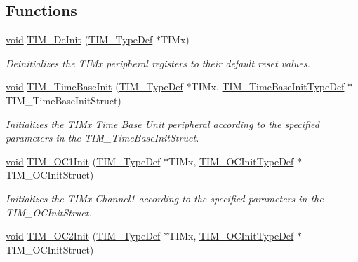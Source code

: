 \subsection*{Functions}
\begin{DoxyCompactItemize}
\item 
\hyperlink{usb__devapi_8h_afabf60e7f57651d6d595a02c75f07cd0}{void} \hyperlink{group___t_i_m___private___functions_ga1659cc0ce503ac151568e0c7c02b1ba5}{T\+I\+M\+\_\+\+De\+Init} (\hyperlink{struct_t_i_m___type_def}{T\+I\+M\+\_\+\+Type\+Def} $\ast$T\+I\+Mx)
\begin{DoxyCompactList}\small\item\em Deinitializes the T\+I\+Mx peripheral registers to their default reset values. \end{DoxyCompactList}\item 
\hyperlink{usb__devapi_8h_afabf60e7f57651d6d595a02c75f07cd0}{void} \hyperlink{group___t_i_m___private___functions_ga83fd58c9416802d9638bbe1715c98932}{T\+I\+M\+\_\+\+Time\+Base\+Init} (\hyperlink{struct_t_i_m___type_def}{T\+I\+M\+\_\+\+Type\+Def} $\ast$T\+I\+Mx, \hyperlink{struct_t_i_m___time_base_init_type_def}{T\+I\+M\+\_\+\+Time\+Base\+Init\+Type\+Def} $\ast$T\+I\+M\+\_\+\+Time\+Base\+Init\+Struct)
\begin{DoxyCompactList}\small\item\em Initializes the T\+I\+Mx Time Base Unit peripheral according to the specified parameters in the T\+I\+M\+\_\+\+Time\+Base\+Init\+Struct. \end{DoxyCompactList}\item 
\hyperlink{usb__devapi_8h_afabf60e7f57651d6d595a02c75f07cd0}{void} \hyperlink{group___t_i_m___private___functions_gafcdb6ff00158862aef7fed5e7a554a3e}{T\+I\+M\+\_\+\+O\+C1\+Init} (\hyperlink{struct_t_i_m___type_def}{T\+I\+M\+\_\+\+Type\+Def} $\ast$T\+I\+Mx, \hyperlink{struct_t_i_m___o_c_init_type_def}{T\+I\+M\+\_\+\+O\+C\+Init\+Type\+Def} $\ast$T\+I\+M\+\_\+\+O\+C\+Init\+Struct)
\begin{DoxyCompactList}\small\item\em Initializes the T\+I\+Mx Channel1 according to the specified parameters in the T\+I\+M\+\_\+\+O\+C\+Init\+Struct. \end{DoxyCompactList}\item 
\hyperlink{usb__devapi_8h_afabf60e7f57651d6d595a02c75f07cd0}{void} \hyperlink{group___t_i_m___private___functions_ga2017455121d910d6ff63ac6f219842c5}{T\+I\+M\+\_\+\+O\+C2\+Init} (\hyperlink{struct_t_i_m___type_def}{T\+I\+M\+\_\+\+Type\+Def} $\ast$T\+I\+Mx, \hyperlink{struct_t_i_m___o_c_init_type_def}{T\+I\+M\+\_\+\+O\+C\+Init\+Type\+Def} $\ast$T\+I\+M\+\_\+\+O\+C\+Init\+Struct)

\end{DoxyCompactItemize}

